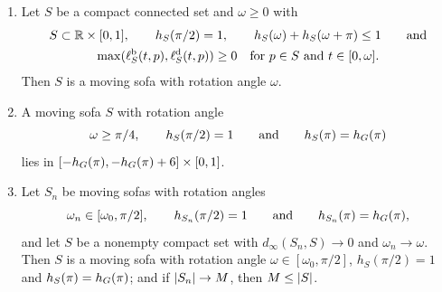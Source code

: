 \begin{lemma}\label{lem:stab-limit}
\begin{enumerate}[label=(\alph*)]
\item\label{lem:stab-limit:move} Let $S$ be a compact connected set and
$\omega\ge0$ with
\begin{gather*}
  S\subset\mathbb{R}\times[0,1],\qquad h_S(\pi/2)=1,\qquad
  h_S(\omega)+h_S(\omega+\pi)\le1\qquad\text{and}\\
  \max(\ell^{\mathrm b}_S(t,p),\ell^{\mathrm d}_S(t,p))\ge0\quad
  \text{for $p\in S$ and $t\in[0,\omega]$}.
\end{gather*}
Then $S$ is a moving sofa with rotation angle $\omega$.
\item\label{lem:stab-limit:box} A moving sofa $S$ with rotation angle
\[
  \omega\ge\pi/4,\qquad h_S(\pi/2)=1\qquad\text{and}\qquad h_S(\pi)=h_G(\pi)
\]
lies in $[-h_G(\pi),-h_G(\pi)+6]\times[0,1]$.
\item\label{lem:stab-limit:lim} Let $S_n$ be moving sofas with rotation
angles
\[
  \omega_n\in[\omega_0,\pi/2],\qquad h_{S_n}(\pi/2)=1\qquad\text{and}\qquad
  h_{S_n}(\pi)=h_G(\pi),
\]
and let $S$ be a nonempty compact set with $d_\infty(S_n,S)\to0$ and
$\omega_n\to\omega$. Then $S$ is a moving sofa with rotation angle
$\omega\in[\omega_0,\pi/2]$, $h_S(\pi/2)=1$ and $h_S(\pi)=h_G(\pi)$; and if
$\lvert S_n\rvert\to M$, then $M\le\lvert S\rvert$.
\end{enumerate}
\end{lemma}

